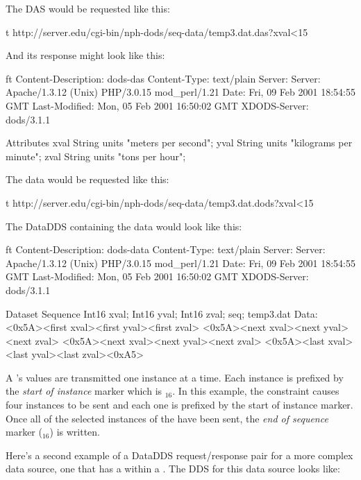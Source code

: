 \documentclass[justify]{nasa-ese}
\renewcommand{\new}[1]{\emph{#1}}
\begin{document}
The DAS would be requested like this:

\begin{vcode}{t}
http://server.edu/cgi-bin/nph-dods/seq-data/temp3.dat.das?xval<15
\end{vcode}

And its response might look like this:

\begin{vcode}{ft}
Content-Description: dods-das
Content-Type: text/plain
Server: Server: Apache/1.3.12 (Unix)  PHP/3.0.15 mod_perl/1.21
Date: Fri, 09 Feb 2001 18:54:55 GMT
Last-Modified: Mon, 05 Feb 2001 16:50:02 GMT
XDODS-Server: dods/3.1.1

Attributes {
  xval {
    String units "meters per second";
  }
  yval {
    String units "kilograms per minute";
  }
  zval {
    String units "tons per hour";
  }
}
\end{vcode}

The data would be requested like this:

\begin{vcode}{t}
http://server.edu/cgi-bin/nph-dods/seq-data/temp3.dat.dods?xval<15
\end{vcode}

The DataDDS containing the data would look like this:

\begin{vcode}{ft}
Content-Description: dods-data
Content-Type: text/plain
Server: Server: Apache/1.3.12 (Unix)  PHP/3.0.15 mod_perl/1.21
Date: Fri, 09 Feb 2001 18:54:55 GMT
Last-Modified: Mon, 05 Feb 2001 16:50:02 GMT
XDODS-Server: dods/3.1.1

Dataset {
  Sequence {
    Int16 xval;
    Int16 yval;
    Int16 zval;
  } seq;
} temp3.dat
Data:
<0x5A><first xval><first yval><first zval>
<0x5A><next xval><next yval><next zval>
<0x5A><next xval><next yval><next zval>
<0x5A><last xval><last yval><last zval><0xA5>
\end{vcode}

A \Sequence's values are transmitted one instance at a time. Each instance is
prefixed by the \new{start of instance} marker which is $_{16}$. In
this example, the constraint  causes four instances to be sent
and each one is prefixed by the start of instance marker. Once all of the
selected instances of the \Sequence have been sent, the \new{end of sequence}
marker ($_{16}$) is written. 

\label{seq:2-level}
Here's a second example of a DataDDS request/response pair for a more complex
data source, one that has a \Sequence within a \Sequence. The DDS for this
data source looks like:
\end{document}
